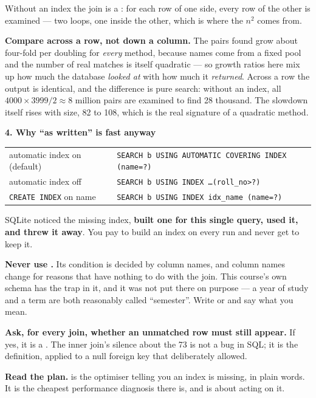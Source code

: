 \begin{measured}
\smallskip
Without an index the join is a : for each row of
one side, every row of the other is examined --- two loops, one inside the
other, which is where the $n^2$ comes from.

\smallskip
\textbf{Compare across a row, not down a column.} The pairs found grow about
four-fold per doubling for \emph{every} method, because names come from a
fixed pool and the number of real matches is itself quadratic --- so growth
ratios here mix up how much the database \emph{looked at} with how much it
\emph{returned}. Across a row the output is identical, and the difference is
pure search: without an index, all $4000 \times 3999 / 2 \approx 8$ million
pairs are examined to find 28 thousand. The slowdown itself rises with size,
82 to 108, which is the real signature of a quadratic method.

\medskip
\textbf{4. Why ``as written'' is fast anyway}

\begin{tabular}{@{}L{4.8cm}L{9.2cm}@{}}
automatic index on (default) & \texttt{SEARCH b USING AUTOMATIC COVERING INDEX (name=?)} \\
automatic index off & \texttt{SEARCH b USING INDEX \dots (roll\_no>?)} \\
\texttt{CREATE INDEX} on name & \texttt{SEARCH b USING INDEX idx\_name (name=?)} \\
\end{tabular}

\smallskip
SQLite noticed the missing index, \textbf{built one for this single query,
used it, and threw it away}. You pay to build an index on every run and never
get to keep it.
\end{measured}

\begin{alertbox}
\begin{tight}
  \item \textbf{Never use .} Its condition is decided by
        column names, and column names change for reasons that have nothing to
        do with the join. This course's own schema has the trap in it, and it
        was not put there on purpose --- a year of study and a term are both
        reasonably called ``semester''. Write  or  and
        say what you mean.
  \item \textbf{Ask, for every join, whether an unmatched row must still
        appear.} If yes, it is a . The inner join's silence
        about the 73 is not a bug in SQL; it is the definition, applied to a
        null foreign key that  deliberately allowed.
  \item \textbf{Read the plan.}  is the optimiser
        telling you an index is missing, in plain words. It is the cheapest
        performance diagnosis there is, and  is about acting on
        it.
\end{tight}
\end{alertbox}

